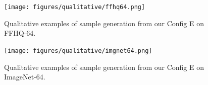 
\FloatBarrier

\FloatBarrier
{
\begin{figure}[h!]
    \setlength{\imgsize}{0.2\linewidth} %
    
    \setlength{\tabcolsep}{0pt} %
    \renewcommand{\arraystretch}{0} %

    \centering
    
    \texttt{[image: figures/qualitative/ffhq64.png]}
    \caption{Qualitative examples of sample generation from our Config E on FFHQ-64.}
    \label{fig:ffhq64}
\end{figure}
}
\FloatBarrier

\FloatBarrier

\FloatBarrier
{
\begin{figure}[ht!]
    \setlength{\imgsize}{0.2\linewidth} %
    
    \setlength{\tabcolsep}{0pt} %
    \renewcommand{\arraystretch}{0} %

    \centering
    
    \texttt{[image: figures/qualitative/imgnet64.png]}
    \caption{Qualitative examples of sample generation from our Config E on ImageNet-64.}
    \label{fig:imgnet-64}
\end{figure}
}
\FloatBarrier

\clearpage
